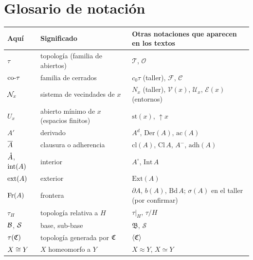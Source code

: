 \section{Glosario de notación}
\begin{center}\small\renewcommand{\arraystretch}{1.3}
\begin{tabular}{@{}p{3.0cm}p{5.2cm}p{7.2cm}@{}}\toprule
\textbf{Aquí} & \textbf{Significado} & \textbf{Otras notaciones que aparecen en los textos}\\ \midrule
$\tau$ & topología (familia de abiertos) & $\mathcal{T}$, $\mathcal{O}$\\
$\mathrm{co}\text{-}\tau$ & familia de cerrados & $c_0\tau$ (taller), $\mathcal{F}$, $\mathcal{C}$\\
$\mathcal{N}_x$ & sistema de vecindades de $x$ & $N_x$ (taller), $\mathcal{V}(x)$, $\mathcal{U}_x$, $\mathcal{E}(x)$ (entornos)\\
$U_x$ & abierto mínimo de $x$ (espacios finitos) & $\mathrm{st}(x)$, $\uparrow\! x$\\
$A'$ & derivado & $A^{d}$, $\mathrm{Der}(A)$, $\mathrm{ac}(A)$\\
$\overline{A}$ & clausura o adherencia & $\mathrm{cl}(A)$, $\mathrm{Cl}\,A$, $A^{-}$, $\mathrm{adh}(A)$\\
$\mathring{A}$, $\operatorname{int}(A)$ & interior & $A^{\circ}$, $\mathrm{Int}\,A$\\
$\operatorname{ext}(A)$ & exterior & $\mathrm{Ext}(A)$\\
$\operatorname{Fr}(A)$ & frontera & $\partial A$, $b(A)$, $\mathrm{Bd}\,A$; $\sigma(A)$ en el taller (por confirmar)\\
$\tau_H$ & topología relativa a $H$ & $\tau|_H$, $\tau/H$\\
$\mathcal{B}$, $\mathcal{S}$ & base, sub-base & $\mathfrak{B}$, $\mathcal{S}$\\
$\tau(\mathfrak{C})$ & topología generada por $\mathfrak{C}$ & $\langle\mathfrak{C}\rangle$\\
$X\cong Y$ & $X$ homeomorfo a $Y$ & $X\approx Y$, $X\simeq Y$\\ \bottomrule
\end{tabular}\end{center}

